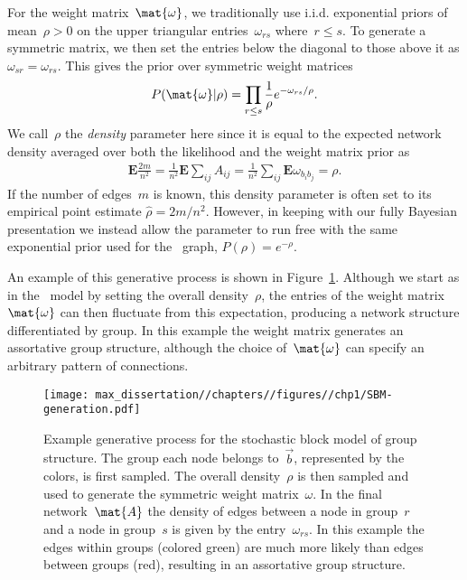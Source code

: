 For the weight matrix~$\mat{\omega}$, we traditionally use i.i.d. exponential priors of mean~$\rho > 0$ on the upper triangular entries~$\omega_{rs}$ where~$r \leq s$. To generate a symmetric matrix, we then set the entries below the diagonal to those above it as $\omega_{sr} = \omega_{rs}$. This gives the prior over symmetric weight matrices \begin{align}
    P(\mat{\omega}|\rho) = \prod_{r \leq s}\frac{1}{\rho} e^{-\omega_{rs}/\rho}. \label{eq:P-omega-given-rho}
\end{align} 
We call~$\rho$ the \emph{density} parameter here since it is equal to the expected network density averaged over both the likelihood and the weight matrix prior as \begin{align}
    \mathbf{E}\frac{2m}{n^2} = \frac{1}{n^2} \mathbf{E} \sum_{ij} A_{ij} = \frac{1}{n^2} \sum_{ij} \mathbf{E} \omega_{b_ib_j} = \rho.
\end{align}
If the number of edges~$m$ is known, this density parameter is often set to its empirical point estimate $\hat{\rho} = 2m/n^2$. However, in keeping with our fully Bayesian presentation we instead allow the parameter to run free with the same exponential prior used for the \ER~graph, $P(\rho) = e^{-\rho}$.

An example of this generative process is shown in Figure~\ref{fig:SBM-generation}. Although we start as in the \ER~model by setting the overall density~$\rho$, the entries of the weight matrix~$\mat{\omega}$ can then fluctuate from this expectation, producing a network structure differentiated by group. In this example the weight matrix generates an assortative group structure, although the choice of~$\mat{\omega}$ can specify an arbitrary pattern of connections. 

\begin{figure}
    \centering
    \texttt{[image: max\_dissertation//chapters//figures//chp1/SBM-generation.pdf]}
    \caption{Example generative process for the stochastic block model of group structure. The group each node belongs to~$\vec{b}$, represented by the colors, is first sampled. The overall density~$\rho$ is then sampled and used to generate the symmetric weight matrix~$\omega$. In the final network~$\mat{A}$ the density of edges between a node in group~$r$ and a node in group~$s$ is given by the entry~$\omega_{rs}$. In this example the edges within groups (colored green) are much more likely than edges between groups (red), resulting in an assortative group structure.}
    \label{fig:SBM-generation}
\end{figure}

